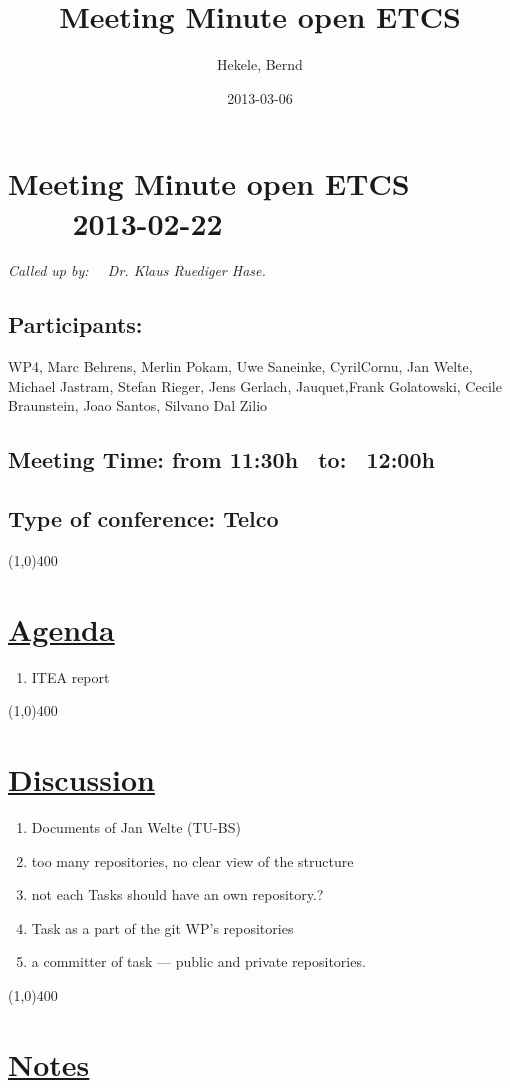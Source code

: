 \documentclass[a4paper]{article}
\title{Meeting Minute open ETCS}
\author{Hekele, Bernd}
\date{2013-03-06}
\begin{document}
\section*{\large{Meeting Minute open ETCS \ \ \ \ 2013-02-22}}

\large{\emph{Called up by: \ \  Dr. Klaus Ruediger Hase.}}

\subsection*{Participants:}WP4, Marc Behrens, Merlin Pokam, Uwe Saneinke, CyrilCornu, Jan Welte, Michael Jastram, Stefan Rieger, Jens Gerlach, Jauquet,Frank Golatowski, Cecile Braunstein,  Joao Santos, Silvano Dal Zilio \\

\subsection*{Meeting Time: from 11:30h \ to: \ 12:00h}
\subsection*{Type of conference: Telco}

\line(1,0){400}
\section*{\underline{Agenda}}
\begin{enumerate}
\item  ITEA report

\end{enumerate}
\line(1,0){400}
\section*{\underline{Discussion}}

\begin{enumerate}
\item  Documents of Jan Welte (TU-BS)
\item  too many repositories, no clear view of the structure
\item  not each Tasks should have an own repository.?
\item Task as a part of the git WP's repositories
\item  a committer  of task --- public and private repositories.

\end{enumerate}

\line(1,0){400}
\section*{\underline{Notes}}
\end{document}
